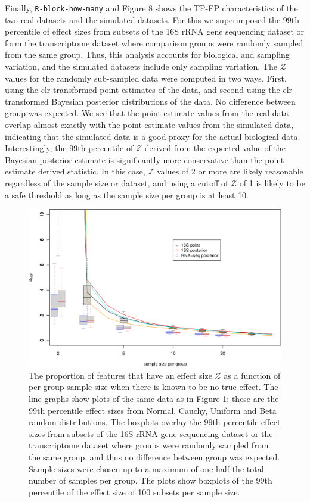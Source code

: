 \documentclass[onecolumn]{article}
\begin{document}
Finally, \texttt{R-block-how-many} and Figure 8 shows the TP-FP
characteristics of the two real datasets and the simulated datasets. For
this we superimposed the 99th percentile of effect sizes from subsets of
the 16S rRNA gene sequencing dataset or form the transcriptome dataset
where comparison groups were randomly sampled from the same group. Thus,
this analysis accounts for biological and sampling variation, and the
simulated datasets include only sampling variation. The \(\mathcal{Z}\)
values for the randomly sub-sampled data were computed in two ways.
First, using the clr-transformed point estimates of the data, and second
using the clr-transformed Bayesian posterior distributions of the data.
No difference between group was expected. We see that the point estimate
values from the real data overlap almost exactly with the point estimate
values from the simulated data, indicating that the simulated data is a
good proxy for the actual biological data. Interestingly, the 99th
percentile of \(\mathcal{Z}\) derived from the expected value of the
Bayesian posterior estimate is significantly more conservative than the
point-estimate derived statistic. In this case, \(\mathcal{Z}\) values
of 2 or more are likely reasonable regardless of the sample size or
dataset, and using a cutoff of \(\mathcal{Z}\) of 1 is likely to be a
safe threshold as long as the sample size per group is at least 10.

\begin{figure}
\centering
\includegraphics{effect_supplement_files/figure-latex/R-block-how-many-1.pdf}
\caption{The proportion of features that have an effect size
\(\mathcal{Z}\) as a function of per-group sample size when there is
known to be no true effect. The line graphs show plots of the same data
as in Figure 1; these are the 99th percentile effect sizes from Normal,
Cauchy, Uniform and Beta random distributions. The boxplots overlay the
99th percentile effect sizes from subsets of the 16S rRNA gene
sequencing dataset or the transcriptome dataset where groups were
randomly sampled from the same group, and thus no difference between
group was expected. Sample sizes were chosen up to a maximum of one half
the total number of samples per group. The plots show boxplots of the
99th percentile of the effect size of 100 subsets per sample size.}
\end{figure}
\end{document}
